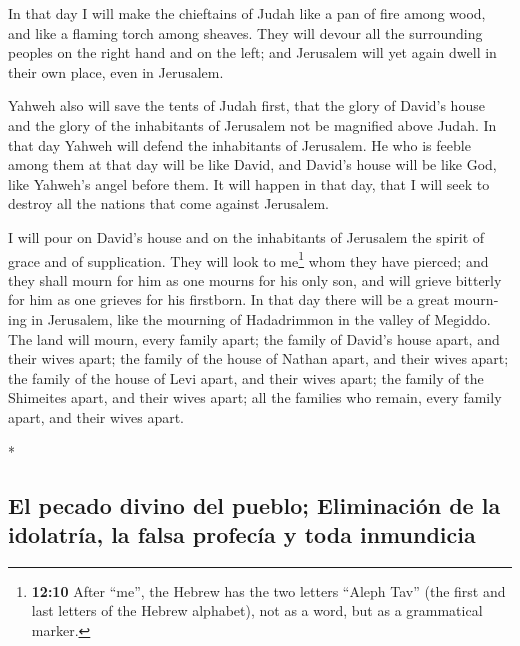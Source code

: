 \begin{paracol}{2}
\begin{otherlanguage}{english}
 In that day I will make the chieftains of Judah like a
pan of fire among wood, and like a flaming torch among sheaves. They
will devour all the surrounding peoples on the right hand and on the
left; and Jerusalem will yet again dwell in their own place, even in
Jerusalem.

 Yahweh also will save the tents of Judah first, that the
glory of David's house and the glory of the inhabitants of Jerusalem not
be magnified above Judah.  In that day Yahweh will defend
the inhabitants of Jerusalem. He who is feeble among them at that day
will be like David, and David's house will be like God, like Yahweh's
angel before them.  It will happen in that day, that I
will seek to destroy all the nations that come against Jerusalem.

 I will pour on David's house and on the inhabitants of
Jerusalem the spirit of grace and of supplication. They will look to
me\footnote{\textbf{12:10} After ``me'', the Hebrew has the two letters
  ``Aleph Tav'' (the first and last letters of the Hebrew alphabet), not
  as a word, but as a grammatical marker.} whom they have pierced; and
they shall mourn for him as one mourns for his only son, and will grieve
bitterly for him as one grieves for his firstborn.  In
that day there will be a great mourning in Jerusalem, like the mourning
of Hadadrimmon in the valley of Megiddo.  The land will
mourn, every family apart; the family of David's house apart, and their
wives apart; the family of the house of Nathan apart, and their wives
apart;  the family of the house of Levi apart, and their
wives apart; the family of the Shimeites apart, and their wives apart;
 all the families who remain, every family apart, and
their wives apart.

\end{otherlanguage}

\switchcolumn[0]*

\hypertarget{el-pecado-divino-del-pueblo-eliminaciuxf3n-de-la-idolatruxeda-la-falsa-profecuxeda-y-toda-inmundicia}{%
\subsection{El pecado divino del pueblo; Eliminación de la idolatría, la
falsa profecía y toda
inmundicia}\label{el-pecado-divino-del-pueblo-eliminaciuxf3n-de-la-idolatruxeda-la-falsa-profecuxeda-y-toda-inmundicia}}


\end{paracol}
